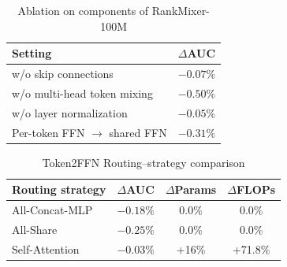 
\begin{table}[h]
\centering
\caption{Ablation on components of RankMixer-100M}
\label{ablation study}
\small
\begin{tabular}{@{\quad}l c@{\quad}}
\toprule
\textbf{Setting} & $\Delta$AUC \\ 
\midrule
w/o skip connections                          & $-0.07\%$ \\
w/o multi-head token mixing                   & $-0.50\%$ \\
w/o layer normalization                       & $-0.05\%$ \\
Per-token FFN $\rightarrow$ shared FFN        & $-0.31\%$ \\
\bottomrule
\end{tabular}
\end{table}

\begin{table}[h]
\centering
\caption{Token2FFN Routing–strategy comparison}
\label{ablation-routing}
\small
\begin{tabular}{@{\quad}l c c c@{\quad}}
\toprule
\textbf{Routing strategy} & $\Delta$AUC & $\Delta$Params & $\Delta$FLOPs \\ 
\midrule
All-Concat-MLP & $-0.18\%$ & 0.0\% & 0.0\% \\
All-Share      & $-0.25\%$ & 0.0\% & 0.0\% \\
Self-Attention & $-0.03\%$ & +16\% & +71.8\% \\
\bottomrule
\end{tabular}
\end{table}

